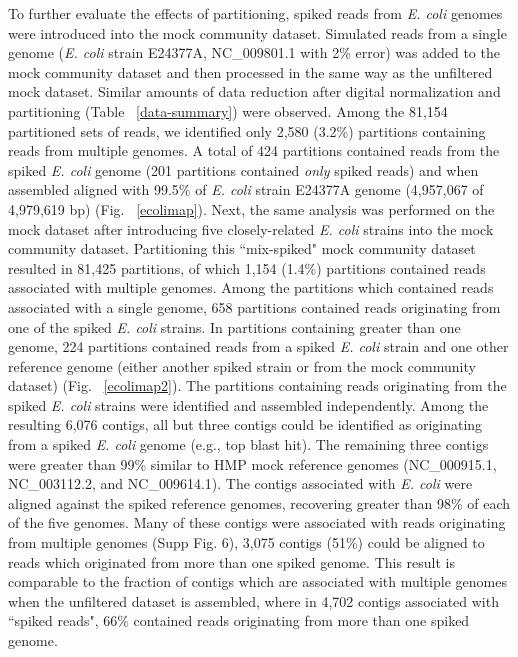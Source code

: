 \documentclass[11pt]{article} %
\begin{document}
To further evaluate the effects of partitioning, spiked reads from
\emph{E. coli} genomes were introduced into the mock community
dataset. Simulated reads from a single genome (\emph{E. coli} strain E24377A,
NC\_009801.1 with 2\% error) was added to the mock community dataset
and then processed in the same way as the unfiltered mock dataset.  Similar
amounts of data reduction after digital normalization and partitioning
(Table ~\ref{data-summary}) were observed.  Among the 81,154
partitioned sets of reads, we identified only 2,580 (3.2\%) partitions
containing reads from multiple genomes.  A total of 424 partitions
contained reads from the spiked \emph{E. coli} genome (201 partitions
contained \emph{only} spiked reads) and when assembled aligned with
99.5\% of \emph{E. coli} strain E24377A genome (4,957,067 of 4,979,619
bp) (Fig. ~\ref{ecolimap}).  Next, the same analysis was performed on
the mock dataset after introducing five closely-related \emph{E. coli}
strains into the mock community dataset.  Partitioning this
``mix-spiked" mock community dataset resulted in 81,425 partitions, of
which 1,154 (1.4\%) partitions contained reads associated with multiple
genomes.  Among the partitions which contained reads associated with a
single genome, 658 partitions contained reads originating from one of
the spiked \emph{E. coli} strains.  In partitions containing greater
than one genome, 224 partitions contained reads from a spiked
\emph{E. coli} strain and one other reference genome (either another
spiked strain or from the mock community dataset)
(Fig. ~\ref{ecolimap2}).  The partitions containing reads originating
from the spiked \emph{E. coli} strains were identified and assembled
independently.  Among the resulting 6,076 contigs, all but three
contigs could be identified as originating from a spiked
\emph{E. coli} genome (e.g., top blast hit).  The remaining three
contigs were greater than 99\% similar to HMP mock reference genomes
(NC\_000915.1, NC\_003112.2, and NC\_009614.1).  The contigs
associated with \emph{E. coli} were aligned against the spiked
reference genomes, recovering greater than 98\% of each of the five
genomes.  Many of these contigs were associated with reads originating
from multiple genomes (Supp Fig. 6), 3,075
contigs (51\%) could be aligned to reads which originated from more
than one spiked genome.  This result is comparable to the fraction of
contigs which are associated with multiple genomes when the unfiltered
dataset is assembled, where in 4,702 contigs associated with ``spiked
reads", 66\% contained reads originating from more than one spiked
genome.
\end{document}
